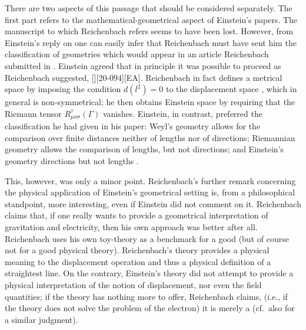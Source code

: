 \documentclass[draft]{article}
\begin{document}
There are two aspects of this passage that should be considered separately. The first part refers to the mathematical-geometrical aspect of Einstein's papers. The manuscript to which Reichenbach refers seems to have been lost. However, from Einstein's reply on  one can easily infer that Reichenbach must have sent him the classification of geometries which would appear in an article Reichenbach submitted in  \citep[][see below in this section]{Reichenbach1929a}. Einstein agreed that in principle it was possible to proceed as Reichenbach suggested, [][20-094][EA]. Reichenbach in fact defines a metrical space by imposing the condition $d(l^2)=0$ to the displacement space \Gtmn, which in general is non-symmetrical; he then obtains Einstein space by requiring that the Riemann tensor $R^\tau_{\mu\nu\sigma}(\Gamma)$ vanishes. Einstein, in contrast, preferred the classification he had given in his paper: Weyl's geometry allows for the comparison over finite distances neither of lengths nor of directions; Riemannian geometry allows the comparison of lengths, but not directions; and Einstein's geometry directions but not lengths \citep{Sauer2006}. 

This, however, was only a minor point. Reichenbach's further remark concerning the physical application of Einstein's geometrical setting is, from a philosophical standpoint, more interesting, even if Einstein did not comment on it. Reichenbach claims that, if one really wants to provide a geometrical interpretation of gravitation and electricity, then his own approach was better after all. Reichenbach uses his own toy-theory as a benchmark for a good  (but of course not for a good physical theory). Reichenbach's theory provides a physical meaning to the displacement operation and thus a physical definition of a straightest line. On the contrary, Einstein's theory did not attempt to provide a physical interpretation of the notion of displacement, nor even the field quantities; if the theory has nothing more to offer, Reichenbach claims, (i.e., if the theory does not solve the problem of the electron) it is merely a  (cf.\ also \cite{Eddington1929} for a similar judgment).
\end{document}
